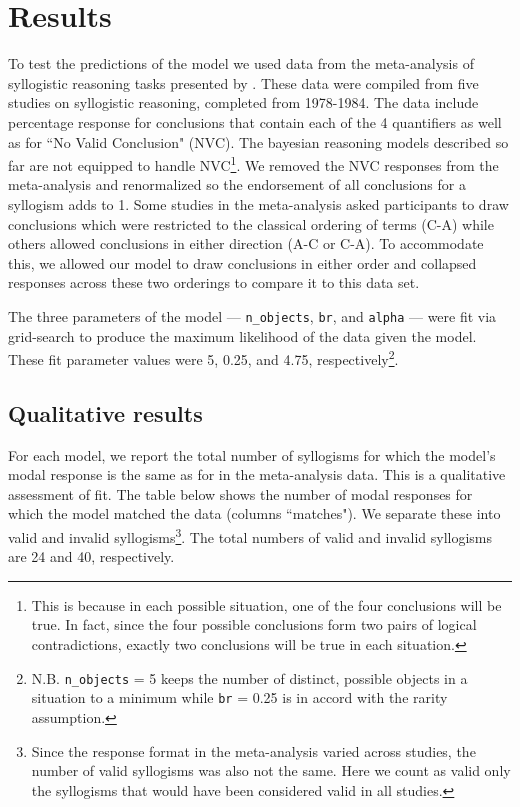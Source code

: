 \documentclass[10pt,letterpaper]{article}
\begin{document}
\section{Results}

To test the predictions of the model we used data from the meta-analysis of syllogistic reasoning tasks presented by . These data were compiled from five studies on syllogistic reasoning, completed from 1978-1984. The data include percentage response for conclusions that contain each of the 4 quantifiers as well as for ``No Valid Conclusion" (NVC). The bayesian reasoning models described so far are not equipped to handle NVC\footnote{This is because in each possible situation, one of the four conclusions will be true. In fact, since the four possible conclusions form two pairs of logical contradictions, exactly two conclusions will be true in each situation.}. We removed the NVC responses from the meta-analysis and renormalized so the endorsement of all conclusions for a syllogism adds to 1. Some studies in the meta-analysis asked participants to draw conclusions which were restricted to the classical ordering of terms (C-A) while others allowed conclusions in either direction (A-C or C-A). To accommodate this, we allowed our model to draw conclusions in either order and collapsed responses across these two orderings to compare it to this data set.
%

The three parameters of the model --- \lstinline{n_objects}, \lstinline{br}, and \lstinline{alpha} --- were fit via grid-search to produce the maximum likelihood of the data given the model. These fit parameter values were 5, 0.25, and 4.75, respectively\footnote{N.B. \lstinline{n_objects} = 5 keeps the number of distinct, possible objects in a situation to a minimum while \lstinline{br} = 0.25 is in accord with the rarity assumption.}.

\subsection{Qualitative results}
For each model, we report the total number of syllogisms for which the model's modal response is the same as for in the meta-analysis data. This is a qualitative assessment of fit. The table below shows the number of modal responses for which the model matched the data (columns ``matches"). We separate these into valid and invalid syllogisms\footnote{Since the response format in the meta-analysis varied across studies, the number of valid syllogisms was also not the same. Here we count as valid only the syllogisms that would have been considered valid in all studies.}. The total numbers of valid and invalid syllogisms are 24 and 40, respectively. 
\end{document}
